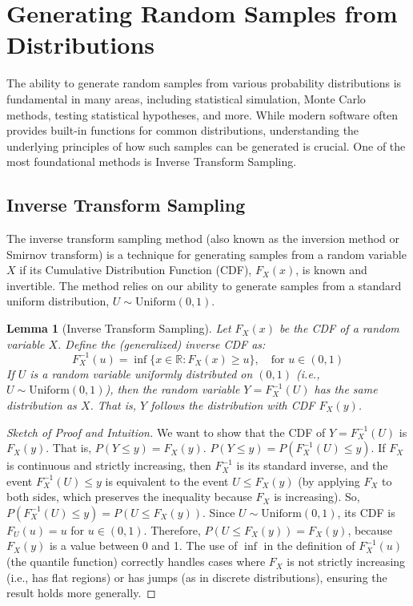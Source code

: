 \documentclass[11pt, letterpaper]{article}
\theoremstyle{plain} %
\newtheorem{lemma}[theorem]{Lemma}
\theoremstyle{definition} %
\theoremstyle{remark} %
\newcommand{\R}{\mathbb{R}}
\newcommand{\Unif}{\mathrm{Uniform}}
\begin{document}
\section{Generating Random Samples from Distributions}
\label{sec:sampling}

The ability to generate random samples from various probability distributions is fundamental in many areas, including statistical simulation, Monte Carlo methods, testing statistical hypotheses, and more. While modern software often provides built-in functions for common distributions, understanding the underlying principles of how such samples can be generated is crucial. One of the most foundational methods is Inverse Transform Sampling.

\subsection{Inverse Transform Sampling}
\label{subsec:inverse_transform}

The inverse transform sampling method (also known as the inversion method or Smirnov transform) is a technique for generating samples from a random variable $X$ if its Cumulative Distribution Function (CDF), $F_X(x)$, is known and invertible. The method relies on our ability to generate samples from a standard uniform distribution, $U \sim \Unif(0,1)$.

\begin{lemma}[Inverse Transform Sampling]
Let $F_X(x)$ be the CDF of a random variable $X$. Define the (generalized) inverse CDF as:
\[ F_X^{-1}(u) = \inf \{x \in \R : F_X(x) \ge u\}, \quad \text{for } u \in (0,1) \]
If $U$ is a random variable uniformly distributed on $(0,1)$ (i.e., $U \sim \Unif(0,1)$), then the random variable $Y = F_X^{-1}(U)$ has the same distribution as $X$. That is, $Y$ follows the distribution with CDF $F_X(y)$.
\end{lemma}

\begin{proof}[Sketch of Proof and Intuition]
We want to show that the CDF of $Y=F_X^{-1}(U)$ is $F_X(y)$. That is, $P(Y \le y) = F_X(y)$.
$P(Y \le y) = P(F_X^{-1}(U) \le y)$.
If $F_X$ is continuous and strictly increasing, then $F_X^{-1}$ is its standard inverse, and the event $F_X^{-1}(U) \le y$ is equivalent to the event $U \le F_X(y)$ (by applying $F_X$ to both sides, which preserves the inequality because $F_X$ is increasing).
So, $P(F_X^{-1}(U) \le y) = P(U \le F_X(y))$.
Since $U \sim \Unif(0,1)$, its CDF is $F_U(u) = u$ for $u \in (0,1)$.
Therefore, $P(U \le F_X(y)) = F_X(y)$, because $F_X(y)$ is a value between 0 and 1.
The use of $\inf$ in the definition of $F_X^{-1}(u)$ (the quantile function) correctly handles cases where $F_X$ is not strictly increasing (i.e., has flat regions) or has jumps (as in discrete distributions), ensuring the result holds more generally.
\end{proof}
\end{document}
